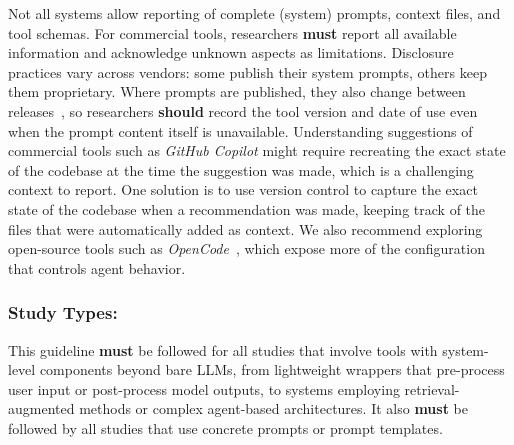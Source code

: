 \documentclass[smallextended]{svjour3}
\newcommand{\must}{\textbf{must}\xspace}
\newcommand{\should}{\textbf{should}\xspace}
\newcommand{\guidelinesubsubsection}[1]{\subsubsection{\bfseries #1:}}
\newcommand{\guidelinesubsubsection}[1]{\subsubsection{#1}}
\begin{document}
Not all systems allow reporting of complete (system) prompts, context files, and tool schemas.
For commercial tools, researchers \must report all available information and acknowledge unknown aspects as limitations.
Disclosure practices vary across vendors: some publish their system prompts, others keep them proprietary.
Where prompts are published, they also change between releases~\cite{willison2026opus}, so researchers \should record the tool version and date of use even when the prompt content itself is unavailable.
Understanding suggestions of commercial tools such as \emph{GitHub Copilot} might require recreating the exact state of the codebase at the time the suggestion was made, which is a challenging context to report.
One solution is to use version control to capture the exact state of the codebase when a recommendation was made, keeping track of the files that were automatically added as context.
We also recommend exploring open-source tools such as \emph{OpenCode}~\cite{opencode}, which expose more of the configuration that controls agent behavior.

\guidelinesubsubsection{Study Types}

This guideline \must be followed for all studies that involve tools with system-level components beyond bare LLMs, from lightweight wrappers that pre-process user input or post-process model outputs, to systems employing retrieval-augmented methods or complex agent-based architectures.
It also \must be followed by all studies that use concrete prompts or prompt templates.
\end{document}

